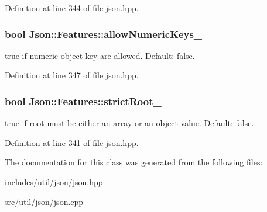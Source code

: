 Definition at line 344 of file json.\-hpp.

\hypertarget{class_json_1_1_features_aff3cb16b79d15d3d761b11a0dd6d4d6b}{
\subsubsection[{allow\-Numeric\-Keys\-\_\-}]{\setlength{\rightskip}{0pt plus 5cm}bool Json\-::\-Features\-::allow\-Numeric\-Keys\-\_\-}}\label{class_json_1_1_features_aff3cb16b79d15d3d761b11a0dd6d4d6b}


{\ttfamily true} if numeric object key are allowed. Default\-: {\ttfamily false}. 



Definition at line 347 of file json.\-hpp.

\hypertarget{class_json_1_1_features_a1162c37a1458adc32582b585b552f9c3}{
\subsubsection[{strict\-Root\-\_\-}]{\setlength{\rightskip}{0pt plus 5cm}bool Json\-::\-Features\-::strict\-Root\-\_\-}}\label{class_json_1_1_features_a1162c37a1458adc32582b585b552f9c3}
{\ttfamily true} if root must be either an array or an object value. Default\-: {\ttfamily false}. 

Definition at line 341 of file json.\-hpp.



The documentation for this class was generated from the following files\-:\begin{DoxyCompactItemize}
\item 
includes/util/json/\hyperlink{json_8hpp}{json.\-hpp}\item 
src/util/json/\hyperlink{json_8cpp}{json.\-cpp}\end{DoxyCompactItemize}
